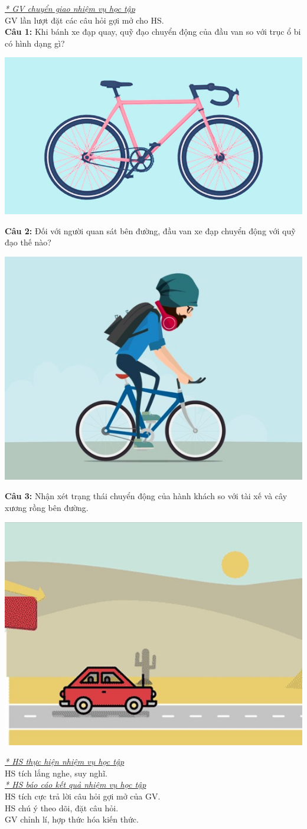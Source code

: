 {\textit{\underline{* GV chuyển giao nhiệm vụ học tập}}\\
	GV lần lượt đặt các câu hỏi gợi mở cho HS.\\
	\textbf{Câu 1:} Khi bánh xe đạp quay, quỹ đạo chuyển động của đầu van so với trục ổ bi có hình dạng gì?
	\begin{center}
		\includegraphics[width=0.4\linewidth]{figs/G10-BAI5-1}
	\end{center}
	\textbf{Câu 2:} Đối với người quan sát bên đường, đầu van xe đạp chuyển động với quỹ đạo thế nào?
	\begin{center}
		\includegraphics[width=0.4\linewidth]{figs/G10-BAI5-2}
	\end{center}
	\textbf{Câu 3:} Nhận xét trạng thái chuyển động của hành khách so với tài xế và cây xương rồng bên đường.
	\begin{center}
		\includegraphics[width=0.4\linewidth]{figs/G10-BAI5-3}
	\end{center}
	\textit{\underline{* HS thực hiện nhiệm vụ học tập}}\\
	HS tích lắng nghe, suy nghĩ.\\
	\textit{\underline{* HS báo cáo kết quả nhiệm vụ học tập}}\\
	HS tích cực trả lời câu hỏi gợi mở của GV.\\
	HS chú ý theo dõi, đặt câu hỏi.\\
	GV chỉnh lí, hợp thức hóa kiến thức.
}
